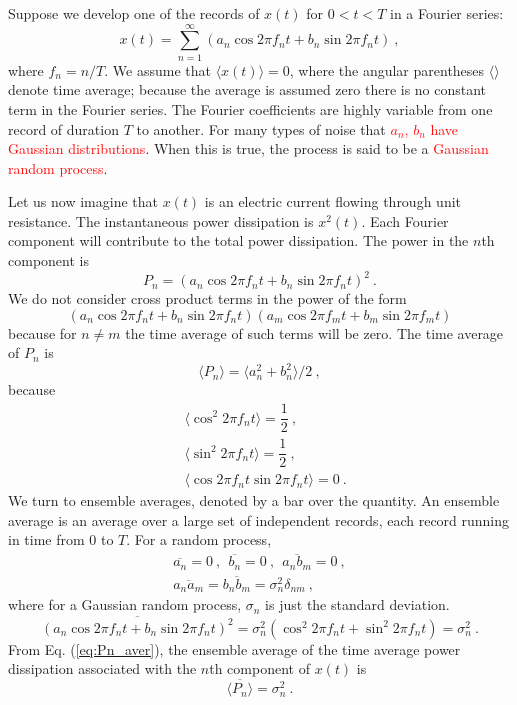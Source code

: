 \documentclass[12pt,a4paper]{article}
\begin{document}
Suppose we develop one of the records of $x(t)$ for $0 < t < T$ in a Fourier series:
\begin{equation}
x(t) = \sum_{n=1}^\infty (a_n \cos 2\pi f_n t+ b_n \sin 2\pi f_n t) ~,
\end{equation}
where $f_n = n/T$. We assume that $\langle x(t) \rangle = 0$, where the angular parentheses $\langle  \rangle$ denote time average; because the average is assumed zero there is no constant term in the Fourier series. The Fourier coefficients are highly variable from one record of duration $T$ to another. For many types of noise that \textcolor{red}{$a_n$, $b_n$ have Gaussian distributions}. When this is true, the process is said to be a \textcolor{red}{Gaussian random process}.

Let us now imagine that $x(t)$ is an electric current flowing through unit resistance. The instantaneous power dissipation is $x^2(t)$. Each Fourier component will contribute to the total power dissipation. The power in the $n$th component is 
\begin{equation}
P_n = (a_n \cos 2\pi f_n t + b_n \sin 2\pi f_n t)^2 ~.
\end{equation}
We do not consider cross product terms in the power of the form
\begin{equation}
(a_n \cos 2\pi f_n t + b_n \sin 2\pi f_n t)(a_m \cos 2\pi f_m t + b_m \sin 2\pi f_m t)
\end{equation}
because for $n\neq m$ the time average of such terms will be zero. The time average of $P_n$ is 
\begin{equation}
\langle P_n \rangle = \langle a_n^2 +b_n^2 \rangle /2 ~,
\label{eq:Pn_aver}
\end{equation}
because 
\begin{align}
\nonumber & \langle \cos^2 2\pi f_n t \rangle = \dfrac{1}{2} ~, \\
\nonumber & \langle \sin^2 2\pi f_n t \rangle = \dfrac{1}{2} ~, \\
\nonumber & \langle \cos 2\pi f_n t \sin 2\pi f_n t \rangle = 0 ~.
\end{align}
We turn to ensemble averages, denoted by a bar over the quantity. An ensemble average is an average over a large set of independent records, each record running in time from $0$ to $T$. For a random process,
\begin{align}
\overline{a_n} = 0 ~, ~~\overline{b_n} = 0 ~, ~~ \overline{a_n b_m} = 0 ~, \\
\overline{a_n a_m} = \overline{b_n b_m} = \sigma_n^2 \delta_{nm} ~, 
\end{align}
where for a Gaussian random process, $\sigma_n$ is just the standard deviation. 
\begin{equation}
\overline{(a_n \cos 2\pi f_n t + b_n \sin 2\pi f_n t)^2} = \sigma_n^2 (\cos^2 2\pi f_n t + \sin^2 2\pi f_n t) = \sigma_n^2 ~.
\end{equation}
From Eq. (\ref{eq:Pn_aver}), the ensemble average of the time average power dissipation associated with the $n$th component of $x(t)$ is
\begin{equation}
\overline{\langle P_n \rangle} = \sigma_n^2 ~.
\end{equation}
\end{document}
